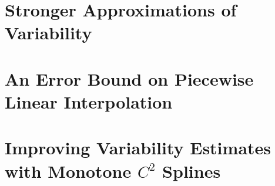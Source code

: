 \documentclass[doublespace,nopageskip]{VTthesis} %
\begin{document}
\chapter{Stronger Approximations of Variability} \label{ch:strong}


\chapter{An Error Bound on Piecewise Linear Interpolation} \label{ch:error}


\chapter{Improving Variability Estimates with Monotone $C^2$ Splines} \label{ch:splines}







\appendix
\end{document}
